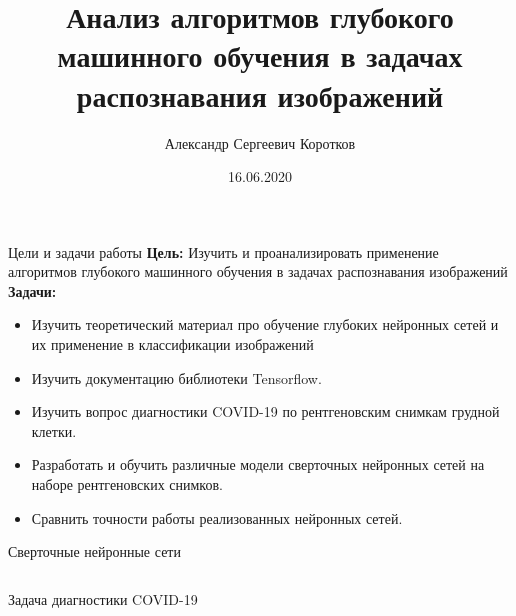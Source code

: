 \documentclass[aspectratio=169]{beamer}
\title{Анализ алгоритмов глубокого машинного обучения  в задачах распознавания изображений}
\author[Коротков А.С.]{Александр Сергеевич Коротков}
\institute[]{Научный руководитель: Д.В. Матвеев}
\date{16.06.2020}
\begin{document}
\maketitle
\begin{frame}{Цели и задачи работы}
    \textbf{Цель:} Изучить и проанализировать применение алгоритмов глубокого машинного обучения в задачах распознавания изображений \\
    \textbf{Задачи: }
    \begin{itemize}
        \item Изучить теоретический материал про обучение глубоких нейронных сетей и их применение в классификации изображений
        \item Изучить документацию библиотеки Tensorflow.
        \item Изучить вопрос диагностики COVID-19 по рентгеновским снимкам грудной клетки.
        \item Разработать и обучить различные модели сверточных нейронных сетей на наборе рентгеновских снимков.
        \item Сравнить точности работы реализованных нейронных сетей.
    \end{itemize}
\end{frame}

\begin{frame}{Сверточные нейронные сети}
    \begin{columns}[T]
        \begin{column}{.4\paperwidth}
            \centering
                
        \end{column}
        \begin{column}{.5\paperwidth}
            
        \end{column}
    \end{columns}   
\end{frame}

\begin{frame}{Задача диагностики COVID-19}
\end{frame}
\end{document}
